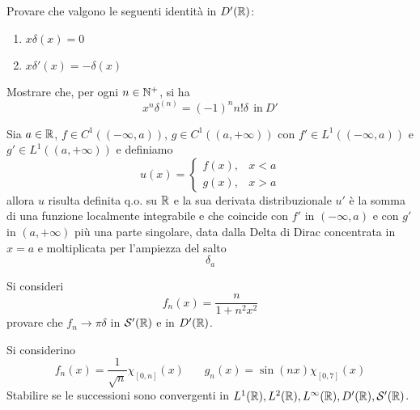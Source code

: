 Provare che valgono le seguenti identità in $D'(\mathbb{R})$:
\begin{enumerate}
\item $x\delta (x) = 0$
\item $x\delta '(x) = - \delta (x)$
\end{enumerate}

Mostrare che, per ogni $n\in \mathbb{N}^{+}$, si ha
\begin{equation*}
\boxed{x^{n} \delta^{(n)} = (- 1)^{n} n!\delta \ \ \text{in} \ D'}
\end{equation*}

Sia $a\in \mathbb{R} $, $f\in C^{1}((- \infty, a))$, $g\in C^{1}((a, + \infty))$ con $f'\in L^{1}((- \infty, a))$ e $g'\in L^{1}((a, + \infty))$ e definiamo
\begin{equation*}
u(x) = 
\begin{cases}
f(x), & x < a\\
g(x), & x > a
\end{cases}
\end{equation*}
allora $u$ risulta definita q.o. su $\mathbb{R} $ e la sua derivata distribuzionale $u'$ è la somma di una funzione localmente integrabile e che coincide con $f'$ in $(- \infty, a)$ e con $g'$ in $(a, + \infty)$ più una parte singolare, data dalla Delta di Dirac concentrata in $x = a$ e moltiplicata per l'ampiezza del salto
\begin{equation*}
[ u(a_{+}) - u(a_{-})] \delta_{a}
\end{equation*}
\Esercizio{}

Si consideri
\begin{equation*}
f_{n}(x) = \frac{n}{1 + n^{2} x^{2}}
\end{equation*}
provare che $f_{n}\rightarrow \pi \delta $ in $\mathcal{S}  '(\mathbb{R})$ e in $D'(\mathbb{R})$.
\Esercizio{}

Si considerino
\begin{equation*}
f_{n}(x) = \frac{1}{\sqrt{n}} \chi_{[ 0, n]}(x) \ \ \ \ \ \ \ \ g_{n}(x) = \sin(nx) \chi_{[ 0, 7]}(x)
\end{equation*}
Stabilire se le successioni sono convergenti in $L^{1}(\mathbb{R}), L^{2}(\mathbb{R}), L^{\infty}(\mathbb{R}), D'(\mathbb{R}), \mathcal{S}  '(\mathbb{R})$.
\Esercizio{}

